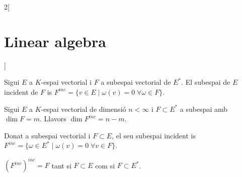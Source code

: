 \documentclass[../../../main.tex]{subfiles}
\begin{document}
\begin{multicols}{2}[\section{Linear algebra}]
\begin{definition}
\end{definition}
\begin{definition}
Sigui $E$ a $K$-espai vectorial i $F$ a subespai vectorial de $E^*$. El subespai de $E$ incident de $F$ is $F^{inc}=\{v\in E\mid \omega(v)=0\;\forall\omega\in F\}$.
\end{definition}
\begin{theorem}
Sigui $E$ a $K$-espai vectorial de dimensió $n<\infty$ i $F\subset E^*$ a subespai amb $\dim F=m$. Llavors $\dim F^{inc}=n-m$.
\end{theorem}
\begin{definition}
Donat a subespai vectorial i $F\subset E$, el seu subespai incident is $F^{inc}=\{\omega\in E^*\mid \omega(v)=0\;\forall v\in F\}$.
\end{definition}
\begin{prop}
$(F^{inc})^{inc}=F$ tant si $F\subset E$ com si $F\subset E^*$.
\end{prop}

\end{multicols}
\end{document}

